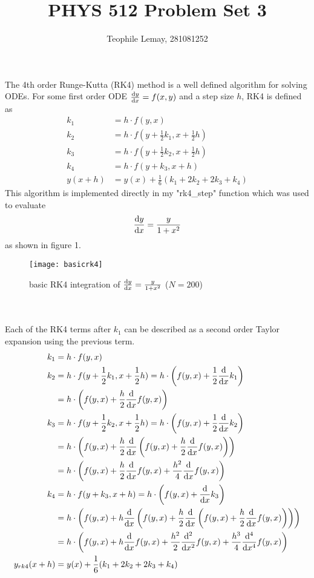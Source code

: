 \documentclass{article}
\title{PHYS 512 Problem Set 3}
\author{Teophile Lemay, 281081252}
\date{}
\newcommand{\<}[1]{\left\langle #1 \right\rangle }
\begin{document}
	\maketitle
	
\section{}
The 4th order Runge-Kutta (RK4) method is a well defined algorithm for solving ODEs. For some first order ODE $\dv{y}{x} = f(x, y)$ and a step size $h$, RK4 is defined as
\begin{align*}
	k_1 &= h\cdot f(y, x)\\
	k_2 &= h\cdot f(y + \frac{1}{2}k_1, x + \frac{1}{2}h)\\
	k_3 &= h\cdot f(y + \frac{1}{2}k_2, x + \frac{1}{2}h)\\
	k_4 &= h\cdot f(y + k_3, x+h)\\
	y(x+h) &= y(x) + \frac{1}{6} (k_1 + 2k_2 + 2k_3 + k_4)
\end{align*}
This algorithm is implemented directly in my "rk4\_step" function which was used to evaluate
\[ \dv{y}{x} = \frac{y}{1+x^2} \]
as shown in figure 1.
\begin{figure}[h]
	\caption{basic RK4 integration of $\dv{y}{x} = \frac{y}{1+x^2}$ ($N=200$)}
	\centering
	\texttt{[image: basicrk4]}
\end{figure}\\
\\
Each of the RK4 terms after $k_1$ can be described as a second order Taylor expansion using the previous term.
\begin{align*}
	k_1 &= h\cdot f(y, x)\\
	k_2 &= h\cdot f(y + \frac{1}{2}k_1, x + \frac{1}{2}h) = h\cdot \left(f(y, x) + \frac{1}{2}\dv{}{x}k_1\right)\\
	 &= h\cdot \left(f(y, x) + \frac{h}{2}\dv{}{x}f(y,x)\right)
	\\
	k_3 &= h\cdot f(y + \frac{1}{2}k_2, x + \frac{1}{2}h) = h\cdot \left(f(y, x) + \frac{1}{2}\dv{}{x}k_2 \right)\\
	 &= h\cdot \left(f(y, x) + \frac{h}{2}\dv{}{x} \left(f(y, x) + \frac{h}{2}\dv{}{x}f(y,x)\right) \right)\\
	 &= h\cdot \left(f(y, x) + \frac{h}{2}\dv{}{x}f(y, x) + \frac{h^2}{4}\dv{}{x}f(y,x) \right)
	\\
	k_4 &= h\cdot f(y + k_3, x+h) = h\cdot \left(f(y,x) + \dv{}{x}k_3 \right)\\
	 &= h\cdot \left(f(y,x) + h\dv{}{x}\left(f(y, x) + \frac{h}{2}\dv{}{x} \left(f(y, x) + \frac{h}{2}\dv{}{x}f(y,x)\right) \right) \right)\\
	 &= h\cdot \left(f(y, x) + h\dv{}{x}f(y,x) + \frac{h^2}{2}\dv[2]{}{x}f(y,x) + \frac{h^3}{4}\dv[4]{}{x}f(y,x) \right)
	 \\
	y_{rk4}(x+h) &= y(x) + \frac{1}{6} (k_1 + 2k_2 + 2k_3 + k_4)
\end{align*}
\end{document}
